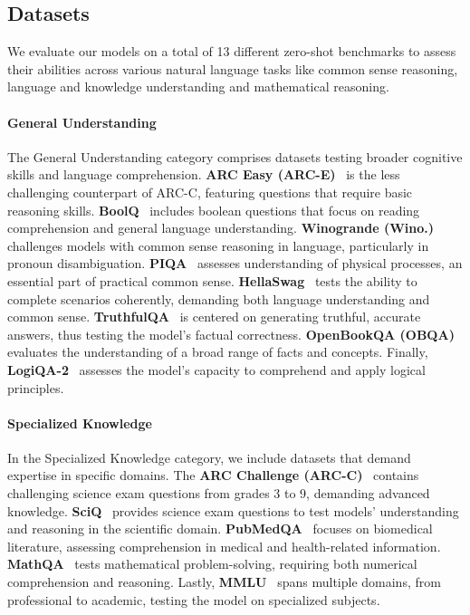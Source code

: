 \documentclass[table]{article}
\begin{document}
\subsection{Datasets}
We evaluate our models on a total of 13 different zero-shot benchmarks to assess their abilities across various natural language tasks like common sense reasoning, language and knowledge understanding and mathematical reasoning.

\paragraph{General Understanding}
The General Understanding category comprises datasets testing broader cognitive skills and language comprehension. \textbf{ARC Easy (ARC-E)}~\citep{allenai:arc} is the less challenging counterpart of ARC-C, featuring questions that require basic reasoning skills. \textbf{BoolQ}~\citep{clark-etal-2019-boolq} includes boolean questions that focus on reading comprehension and general language understanding. \textbf{Winogrande (Wino.)}~\citep{ai2:winogrande} challenges models with common sense reasoning in language, particularly in pronoun disambiguation. \textbf{PIQA}~\citep{Bisk2020} assesses understanding of physical processes, an essential part of practical common sense. \textbf{HellaSwag}~\citep{zellers2019hellaswag} tests the ability to complete scenarios coherently, demanding both language understanding and common sense. \textbf{TruthfulQA}~\citep{lin2021truthfulqa} is centered on generating truthful, accurate answers, thus testing the model's factual correctness. \textbf{OpenBookQA (OBQA)}~\citep{OpenBookQA2018} evaluates the understanding of a broad range of facts and concepts. Finally, \textbf{LogiQA-2}~\citep{logiqa2} assesses the model's capacity to comprehend and apply logical principles.

\paragraph{Specialized Knowledge}
In the Specialized Knowledge category, we include datasets that demand expertise in specific domains. The \textbf{ARC Challenge (ARC-C)}~\citep{allenai:arc} contains challenging science exam questions from grades 3 to 9, demanding advanced knowledge. \textbf{SciQ}~\citep{SciQ} provides science exam questions to test models' understanding and reasoning in the scientific domain. \textbf{PubMedQA}~\citep{jin2019pubmedqa} focuses on biomedical literature, assessing comprehension in medical and health-related information. 
\textbf{MathQA}~\citep{amini-etal-2019-mathqa} tests mathematical problem-solving, requiring both numerical comprehension and reasoning. Lastly, \textbf{MMLU}~\citep{hendryckstest2021} spans multiple domains, from professional to academic, testing the model on specialized subjects.
\end{document}
